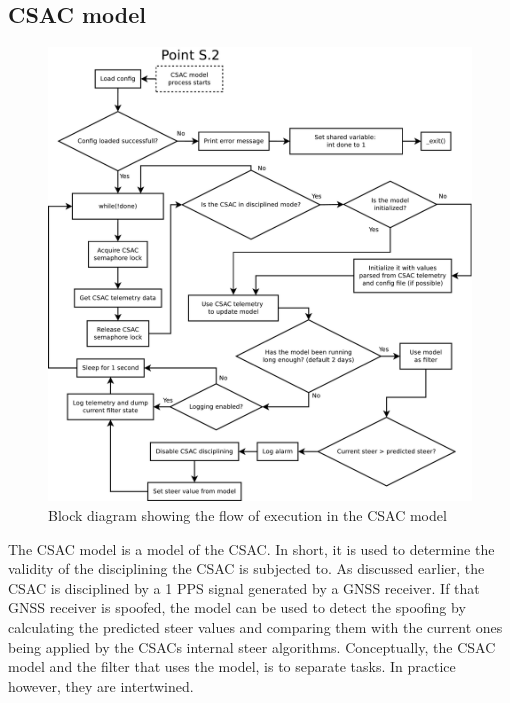 \documentclass[12pt,english,a4paper]{report}
\begin{document}
\subsection{CSAC model}
\begin{figure}
\centering
  \includegraphics[scale=0.30]{csac_filter_model.pdf}
   \caption[CSAC model execution flow block diagram]{Block diagram showing the flow of execution in the CSAC model}
   \label{csac_filter}
\end{figure}
The CSAC model is a model of the CSAC. In short, it is used to determine the validity of the disciplining the CSAC is subjected to. As discussed earlier, the CSAC is disciplined by a 1 PPS signal generated by a GNSS receiver. If that GNSS receiver is spoofed, the model can be used to detect the spoofing by calculating the predicted steer values and comparing them with the current ones being applied by the CSACs internal steer algorithms. Conceptually, the CSAC model and the filter that uses the model, is to separate tasks. In practice however, they are intertwined. 
\end{document}
